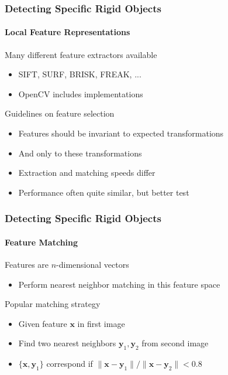 \documentclass[xetex,professionalfont]{beamer}
\renewcommand{\vec}[1]{\ensuremath{\mathbf{#1}}}
\newcommand{\vx}{\vec{x}}
\newcommand{\vy}{\vec{y}}
\begin{document}
\begin{frame}
\frametitle{Detecting Specific Rigid Objects}
\framesubtitle{Local Feature Representations}

Many different feature extractors available
\begin{itemize}
    \item SIFT, SURF, BRISK, FREAK, ... %
    \item OpenCV includes implementations
\end{itemize}

\bigskip
Guidelines on feature selection
\begin{itemize}
    \item Features should be invariant to expected transformations %
    \item And only to these transformations
    \item Extraction and matching speeds differ %
    \item Performance often quite similar, but better test %
\end{itemize}

\end{frame}


\begin{frame}
\frametitle{Detecting Specific Rigid Objects}
\framesubtitle{Feature Matching}

Features are $n$-dimensional vectors
\begin{itemize}
    \item Perform nearest neighbor matching in this feature space
\end{itemize}

\bigskip
Popular matching strategy
\begin{itemize}
    \item Given feature $\vx$ in first image
    \item Find two nearest neighbors $\vy_1,\vy_2$ from second image
    \item $\{\vx,\vy_1\}$ correspond if $\lVert\vx-\vy_1\rVert/\lVert\vx-\vy_2\rVert<0.8$ %
\end{itemize}

\end{frame}
\end{document}
